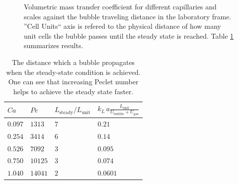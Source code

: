 \documentclass{article}
\newcommand{\vol}{k_L\,a}
\newcommand{\lunit}{L_{\mathrm{unit}}}
\newcommand{\ububble}{U_{\mathrm{bubble}}}
\newcommand{\ugas}{U_{\mathrm{gas}}}
\newcommand{\volnondim}{\vol \frac{\lunit}{\ububble+\ugas}}
\begin{document}
\begin{figure}[htb!]
\caption{Volumetric mass transfer coefficient for different capillaries and scales against the
bubble traveling distance in the laboratory frame. ''Cell Units`` axis is refered to the physical
distance of how many unit cells the bubble passes until the steady state is reached. Table
\ref{table:steady:state:average}
summarizes results.\label{fig:aver:conc:different:capillaries}}
\end{figure}
\begin{table}[htb!]
\begin{tabularx}{\textwidth}{|X|X|X|X|}
\hline
$Ca$    &$Pe$     &$L_{\mathrm{steady}}/\lunit$& $\volnondim$ \\
\hline
$0.097$ &$1313$  &$7$&$0.21$  \\ 
$0.254$ &$3414$  &$6$&$0.14$  \\ 
$0.526$ &$7092$  &$3$&$0.095$ \\
$0.750$ &$10125$ &$3$&$0.074$ \\
$1.040$ &$14041$ &$2$&$0.0601$\\
\hline
\end{tabularx}
\caption{The distance which a bubble propagates when the
steady-state condition is achieved. One can see that increasing
Peclet number helps to achieve the steady state faster.\label{table:steady:state:average}}
\end{table}
\end{document}
